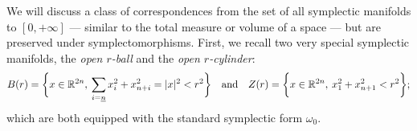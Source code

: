 \documentclass[../main-v2-manifolds.tex]{subfiles}
\begin{document}
\graphicspath{{../images/}{images/}} 

\providecommand{\Grom}{\mathrm{Gromov}}
\providecommand{\Periodic}{\mathrm{Periodic}}
\providecommand{\frakc}{\mathfrak{C}}
%

We will discuss a class of correspondences from the set of all symplectic manifolds to $[0,+\infty]$ --- similar to the total measure or volume of a space --- but are preserved under symplectomorphisms. First, we recall two very special symplectic manifolds, the \emph{open $r$-ball} and the \emph{open $r$-cylinder}:
\[
    B(r) = \bigset{x\in\realtn,\: \sum_{i=\underline{n}} x^2_{i} + x^2_{n+i}=\abs{x}^2<r^2}\qqtext{and}Z(r) = \bigset{x\in\realtn,\: x^2_1 + x^2_{n+1}<r^2};
\]
which are both equipped with the standard symplectic form $\omega_0$.\\
\end{document}
